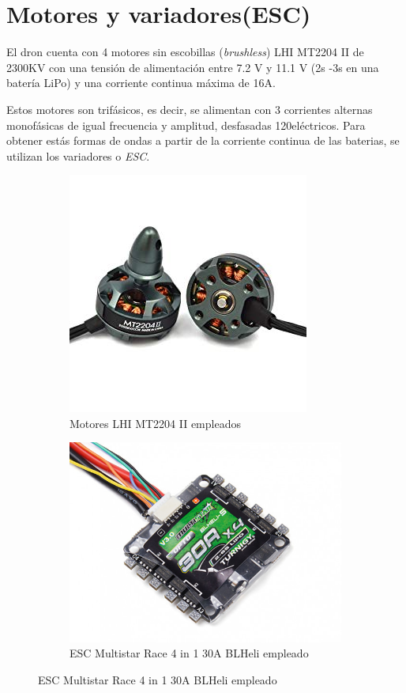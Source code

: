 \section{Motores y variadores(ESC)}
El dron cuenta con 4 motores sin escobillas (\textit{brushless}) LHI MT2204 II de 2300KV con una tensión de alimentación entre 7.2 V y 11.1 V (2s -3s en una batería LiPo) y una corriente continua máxima de 16A.

Estos motores son trifásicos, es decir, se alimentan con 3 corrientes alternas monofásicas de igual frecuencia y amplitud, desfasadas 120\grad \;eléctricos. Para obtener estás formas de ondas a partir de la corriente continua de las baterias, se utilizan los variadores o \textit{ESC}.\\

\begin{figure}[htb!]
	\centering
	\begin{subfigure}{0.4\textwidth}
		\centering
		\includegraphics[height=0.2\textheight]{hardware/motores.jpg}
		\caption{Motores LHI MT2204 II empleados}
		\label{hardware:motores}
	\end{subfigure}
	\begin{subfigure}{0.4\textwidth}
		\centering
		\includegraphics[height=0.2\textheight]{hardware/esc.jpg}
		\caption{ESC Multistar Race 4 in 1 30A BLHeli empleado}
		\label{hardware:esc}
	\end{subfigure}
\end{figure}



